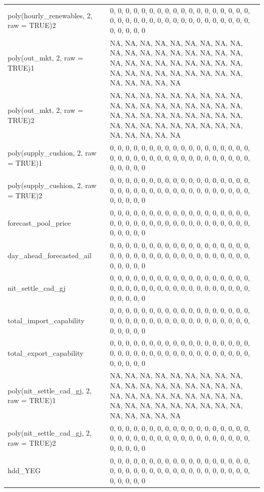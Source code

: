 \begin{table}
{\begin{tabular}[t]{ll}
poly(hourly\_renewables, 2, raw = TRUE)2 & 0, 0, 0, 0, 0, 0, 0, 0, 0, 0, 0, 0, 0, 0, 0, 0, 0, 0, 0, 0, 0, 0, 0, 0, 0, 0, 0, 0, 0, 0, 0, 0, 0, 0, 0, 0, 0, 0, 0, 0, 0\\
poly(out\_mkt, 2, raw = TRUE)1 & NA, NA, NA, NA, NA, NA, NA, NA, NA, NA, NA, NA, NA, NA, NA, NA, NA, NA, NA, NA, NA, NA, NA, NA, NA, NA, NA, NA, NA, NA, NA, NA, NA, NA, NA, NA, NA, NA, NA, NA, NA\\
\addlinespace
poly(out\_mkt, 2, raw = TRUE)2 & NA, NA, NA, NA, NA, NA, NA, NA, NA, NA, NA, NA, NA, NA, NA, NA, NA, NA, NA, NA, NA, NA, NA, NA, NA, NA, NA, NA, NA, NA, NA, NA, NA, NA, NA, NA, NA, NA, NA, NA, NA\\
poly(supply\_cushion, 2, raw = TRUE)1 & 0, 0, 0, 0, 0, 0, 0, 0, 0, 0, 0, 0, 0, 0, 0, 0, 0, 0, 0, 0, 0, 0, 0, 0, 0, 0, 0, 0, 0, 0, 0, 0, 0, 0, 0, 0, 0, 0, 0, 0, 0\\
poly(supply\_cushion, 2, raw = TRUE)2 & 0, 0, 0, 0, 0, 0, 0, 0, 0, 0, 0, 0, 0, 0, 0, 0, 0, 0, 0, 0, 0, 0, 0, 0, 0, 0, 0, 0, 0, 0, 0, 0, 0, 0, 0, 0, 0, 0, 0, 0, 0\\
forecast\_pool\_price & 0, 0, 0, 0, 0, 0, 0, 0, 0, 0, 0, 0, 0, 0, 0, 0, 0, 0, 0, 0, 0, 0, 0, 0, 0, 0, 0, 0, 0, 0, 0, 0, 0, 0, 0, 0, 0, 0, 0, 0, 0\\
day\_ahead\_forecasted\_ail & 0, 0, 0, 0, 0, 0, 0, 0, 0, 0, 0, 0, 0, 0, 0, 0, 0, 0, 0, 0, 0, 0, 0, 0, 0, 0, 0, 0, 0, 0, 0, 0, 0, 0, 0, 0, 0, 0, 0, 0, 0\\
\addlinespace
nit\_settle\_cad\_gj & 0, 0, 0, 0, 0, 0, 0, 0, 0, 0, 0, 0, 0, 0, 0, 0, 0, 0, 0, 0, 0, 0, 0, 0, 0, 0, 0, 0, 0, 0, 0, 0, 0, 0, 0, 0, 0, 0, 0, 0, 0\\
total\_import\_capability & 0, 0, 0, 0, 0, 0, 0, 0, 0, 0, 0, 0, 0, 0, 0, 0, 0, 0, 0, 0, 0, 0, 0, 0, 0, 0, 0, 0, 0, 0, 0, 0, 0, 0, 0, 0, 0, 0, 0, 0, 0\\
total\_export\_capability & 0, 0, 0, 0, 0, 0, 0, 0, 0, 0, 0, 0, 0, 0, 0, 0, 0, 0, 0, 0, 0, 0, 0, 0, 0, 0, 0, 0, 0, 0, 0, 0, 0, 0, 0, 0, 0, 0, 0, 0, 0\\
poly(nit\_settle\_cad\_gj, 2, raw = TRUE)1 & NA, NA, NA, NA, NA, NA, NA, NA, NA, NA, NA, NA, NA, NA, NA, NA, NA, NA, NA, NA, NA, NA, NA, NA, NA, NA, NA, NA, NA, NA, NA, NA, NA, NA, NA, NA, NA, NA, NA, NA, NA\\
poly(nit\_settle\_cad\_gj, 2, raw = TRUE)2 & 0, 0, 0, 0, 0, 0, 0, 0, 0, 0, 0, 0, 0, 0, 0, 0, 0, 0, 0, 0, 0, 0, 0, 0, 0, 0, 0, 0, 0, 0, 0, 0, 0, 0, 0, 0, 0, 0, 0, 0, 0\\
\addlinespace
hdd\_YEG & 0, 0, 0, 0, 0, 0, 0, 0, 0, 0, 0, 0, 0, 0, 0, 0, 0, 0, 0, 0, 0, 0, 0, 0, 0, 0, 0, 0, 0, 0, 0, 0, 0, 0, 0, 0, 0, 0, 0, 0, 0\\

\end{tabular}}
\end{table}
